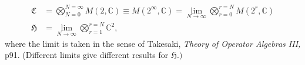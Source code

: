 \documentclass[aps,preprint]{revtex4}%
\begin{document}
%

\begin{align}
\mathfrak{C}  &  =%
{\displaystyle\bigotimes\limits_{N=0}^{N=\infty}}
M\left(  2,\mathbb{C}\right)  \equiv M\left(  2^{\infty},\mathbb{C}\right)
=\lim_{N\rightarrow\infty}%
{\displaystyle\bigotimes\limits_{r=0}^{r=N}}
M\left(  2^{r},\mathbb{C}\right) \\
\mathfrak{H}  &  =\lim_{N\rightarrow\infty}%
{\displaystyle\bigotimes\limits_{r=1}^{r=N}}
\mathbb{C}^{2},
\end{align}
where the limit is taken in the sense of Takesaki, \textit{Theory of Operator
Algebras III, }p91. (Different limits give different results for
$\mathfrak{H.)}$
\end{document}
